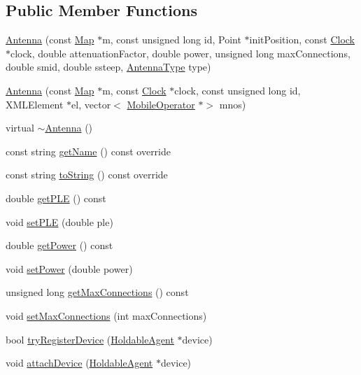 \subsection*{Public Member Functions}
\begin{DoxyCompactItemize}
\item 
\hyperlink{class_antenna_a39c505109145908a5b032a16a2fe53c4}{Antenna} (const \hyperlink{class_map}{Map} $\ast$m, const unsigned long id, Point $\ast$init\+Position, const \hyperlink{class_clock}{Clock} $\ast$clock, double attenuation\+Factor, double power, unsigned long max\+Connections, double smid, double ssteep, \hyperlink{_antenna_type_8h_a7b678b5cb9dedc607131200119d96b16}{Antenna\+Type} type)
\item 
\hyperlink{class_antenna_a4b1da762cac812d1c6616271a392c0e7}{Antenna} (const \hyperlink{class_map}{Map} $\ast$m, const \hyperlink{class_clock}{Clock} $\ast$clock, const unsigned long id, X\+M\+L\+Element $\ast$el, vector$<$ \hyperlink{class_mobile_operator}{Mobile\+Operator} $\ast$$>$ mnos)
\item 
virtual \hyperlink{class_antenna_ad7b98073b970db5d6bc83c5c5961fe44}{$\sim$\+Antenna} ()
\item 
const string \hyperlink{class_antenna_a4ad9da1ca9d79f20b331c22b94c57a02}{get\+Name} () const override
\item 
const string \hyperlink{class_antenna_a7fea30e065f49a3cbcee02f60bd033c8}{to\+String} () const override
\item 
double \hyperlink{class_antenna_ab0c45eb94291446fc48c312854f8818d}{get\+P\+LE} () const
\item 
void \hyperlink{class_antenna_ac0724f137d8e0af08d30ce2d07e6aa87}{set\+P\+LE} (double ple)
\item 
double \hyperlink{class_antenna_afca01d00c8e393ee911f1e9240b51d2e}{get\+Power} () const
\item 
void \hyperlink{class_antenna_a172a4c7765dea045d6504f6e2cbe0f59}{set\+Power} (double power)
\item 
unsigned long \hyperlink{class_antenna_ac7d42215283cd7d4dc16d449f61af91d}{get\+Max\+Connections} () const
\item 
void \hyperlink{class_antenna_ad844ed8507afb83b74b804c2434a4e50}{set\+Max\+Connections} (int max\+Connections)
\item 
bool \hyperlink{class_antenna_a4455f5c804e1ea520dd849dc9fd7b0b4}{try\+Register\+Device} (\hyperlink{class_holdable_agent}{Holdable\+Agent} $\ast$device)
\item 
void \hyperlink{class_antenna_a9c804d991a545157feb066761b6a69ef}{attach\+Device} (\hyperlink{class_holdable_agent}{Holdable\+Agent} $\ast$device)
$$
\end{DoxyCompactItemize}

